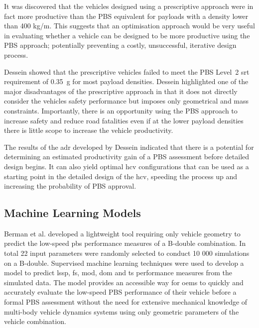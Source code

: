 It was discovered that the vehicles designed using a prescriptive approach were in fact more productive than the PBS equivalent for payloads with a density lower than 400 kg/m\ssth{}. This suggests that an optimisation approach would be very useful in evaluating whether a vehicle can be designed to be more productive using the PBS approach; potentially preventing a costly, unsuccessful, iterative design process.

Dessein showed that the prescriptive vehicles failed to meet the PBS Level~2 \gls{srt} requirement of 0.35~g for most payload densities. Dessein highlighted one of the major disadvantages of the prescriptive approach in that it does not directly consider the vehicles safety performance but imposes only geometrical and mass constraints. Importantly, there is an opportunity using the PBS approach to increase safety and reduce road fatalities even if at the lower payload densities there is little scope to increase the vehicle productivity.

The results of the \gls{adr} developed by Dessein indicated that there is a potential for determining an estimated productivity gain of a PBS assessment before detailed design begins. It can also yield optimal \gls{hcv} configurations that can be used as a starting point in the detailed design of the \gls{hcv}, speeding the process up and increasing the probability of PBS approval.

\subsection{Machine Learning Models}\label{section:machine-learning models}

Berman et al. \cite{Berman2015} developed a lightweight tool requiring only vehicle geometry to predict the low-speed \gls{pbs} performance measures of a B-double combination. In total 22 input parameters were randomly selected to conduct 10 000 simulations on a B-double. Supervised machine learning techniques were used to develop a model to predict \gls{lssp}, \gls{fs}, \gls{mod}, \gls{dom} and \gls{ts} performance measures from the simulated data. The model provides an accessible way for \glspl{oem} to quickly and accurately evaluate the low-speed PBS performance of their vehicle before a formal PBS assessment without the need for extensive mechanical knowledge of multi-body vehicle dynamics systems using only geometric parameters of the vehicle combination.


